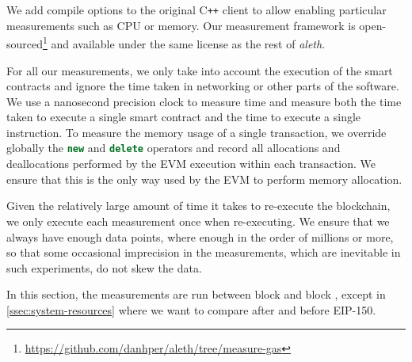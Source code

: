 We add compile options to the original C\texttt{++} client to allow enabling particular measurements such as CPU or memory. Our measurement framework is open-sourced\footnote{\url{https://github.com/danhper/aleth/tree/measure-gas}} and available under the same license as the rest of \textit{aleth}.

For all our measurements, we only take into account the execution of the smart contracts and ignore the time taken in networking or other parts of the software. We use a nanosecond precision clock to measure time and measure both the time taken to execute a single smart contract and the time to execute a single instruction. To measure the memory usage of a single transaction, we override globally the \lstinline[language=C++]{new} and \lstinline[language=C++]{delete} operators and record all allocations and deallocations performed by the EVM execution within each transaction. We ensure that this is the only way used by the EVM to perform memory allocation.

Given the relatively large amount of time it takes to re-execute the blockchain, we only execute each measurement once when re-executing. We ensure that we always have enough data points, where enough in the order of millions or more, so that some occasional imprecision in the measurements, which are inevitable in such experiments, do not skew the data.

In this section, the measurements are run between block  and block , except in \autoref{ssec:system-resources} where we want to compare after and before EIP-150.


